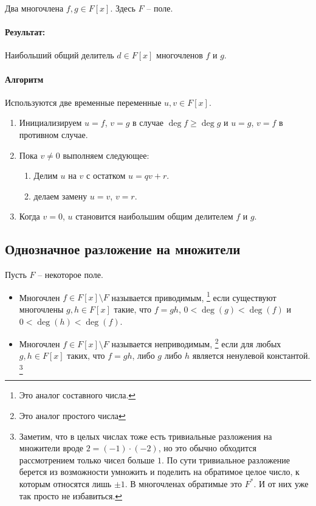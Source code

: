 Два многочлена $f, g\in F[x]$.
Здесь $F$ -- поле.

\paragraph{Результат:}

Наибольший общий делитель $d\in F[x]$ многочленов $f$ и $g$.

\paragraph{Алгоритм}

Используются две временные переменные $u, v\in F[x]$.

\begin{enumerate}
\item Инициализируем $u = f$, $v = g$ в случае $\deg f \geqslant \deg g$ и $u = g$, $v = f$ в противном случае.

\item Пока $v \neq 0$ выполняем следующее:
\begin{enumerate}
\item Делим $u$ на $v$ с остатком $u = q v + r$.

\item делаем замену $u = v$, $v = r$.
\end{enumerate}

\item Когда $v = 0$, $u$ становится наибольшим общим делителем $f$ и $g$.
\end{enumerate}

\subsection{Однозначное разложение на множители}

\begin{definition}
Пусть $F$ -- некоторое поле.
\begin{itemize}
\item Многочлен $ f\in F[x]\setminus F$ называется приводимым,%
\footnote{Это аналог составного числа.}
если существуют многочлены $g,h\in F[x]$ такие, что $f = gh$, $0<\deg (g) < \deg (f)$ и $0 < \deg(h) < \deg(f)$.

\item Многочлен $f\in F[x]\setminus F$ называется неприводимым,%
\footnote{Это аналог простого числа}
если для любых $g,h\in F[x]$ таких, что $f = gh$, либо $g$ либо $h$ является ненулевой константой.%
\footnote{Заметим, что в целых числах тоже есть тривиальные разложения на множители вроде $2 = (-1) \cdot (- 2)$, но это обычно обходится рассмотрением только чисел больше $1$.
По сути тривиальное разложение берется из возможности умножить и поделить на обратимое целое число, к которым относятся лишь $\pm 1$.
В многочленах обратимые это $F^*$.
И от них уже так просто не избавиться.}
\end{itemize}
\end{definition}

